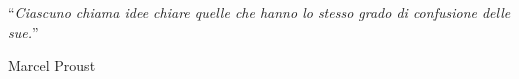 \vspace*{0.2\textheight}

\noindent\enquote{\itshape Ciascuno chiama idee chiare quelle che hanno lo stesso grado di confusione delle sue.}\bigbreak

\hfill Marcel Proust